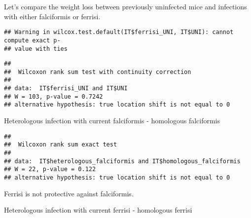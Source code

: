 \documentclass[
]{article}
\newenvironment{Shaded}{\begin{snugshade}}{\end{snugshade}}
\newcommand{\FunctionTok}[1]{\textcolor[rgb]{0.00,0.00,0.00}{#1}}
\newcommand{\NormalTok}[1]{#1}
\newcommand{\SpecialCharTok}[1]{\textcolor[rgb]{0.00,0.00,0.00}{#1}}
\begin{document}
Let's compare the weight loss between previously uninfected mice and
infections with either falciformis or ferrisi.

\begin{Shaded}
\end{Shaded}

\begin{verbatim}
## Warning in wilcox.test.default(IT$ferrisi_UNI, IT$UNI): cannot compute exact p-
## value with ties
\end{verbatim}

\begin{verbatim}
## 
##  Wilcoxon rank sum test with continuity correction
## 
## data:  IT$ferrisi_UNI and IT$UNI
## W = 103, p-value = 0.7242
## alternative hypothesis: true location shift is not equal to 0
\end{verbatim}

Heterologous infection with current falciformis - homologous falciformis

\begin{Shaded}
\end{Shaded}

\begin{verbatim}
## 
##  Wilcoxon rank sum exact test
## 
## data:  IT$heterologous_falciformis and IT$homologous_falciformis
## W = 22, p-value = 0.122
## alternative hypothesis: true location shift is not equal to 0
\end{verbatim}

Ferrisi is not protective against falciformis.

Heterologous infection with current ferrisi - homologous ferrisi

\begin{Shaded}
\end{Shaded}
\end{document}

